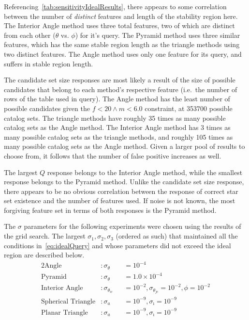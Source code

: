 Referencing~\autoref{tab:sensitivityIdealResults}, there appears to some correlation between the number of
\textit{distinct} features and length of the stability region here.
The Interior Angle method uses three total features, two of which are distinct from each other ($\theta$ vs. $\phi$) for
it's query.
The Pyramid method uses three similar features, which has the same stable region length as the triangle methods
using two distinct features.
The Angle method uses only one feature for its query, and suffers in stable region length.

The candidate set size responses are most likely a result of the size of possible candidates that belong to each
method's respective feature (i.e.\ the number of rows of the table used in query).
The Angle method has the least number of possible candidates given the $f < 20 \land m < 6.0$ constraint, at 353700
possible catalog sets.
The triangle methods have roughly 35 times as many possible catalog sets as the Angle method.
The Interior Angle method has 3 times as many possible catalog sets as the triangle methods, and roughly 105 times as many
possible catalog sets as the Angle method.
Given a larger pool of results to choose from, it follows that the number of false positive increases as well.

The largest $Q$ response belongs to the Interior Angle method, while the smallest response belongs to the Pyramid method.
Unlike the candidate set size response, there appears to be no obvious correlation between the response of correct
star set existence and the number of features used.
If noise is not known, the most forgiving feature set in terms of both responses is the Pyramid method.

The $\sigma$ parameters for the following experiments were chosen using the results of the grid search.
The largest $\sigma_1, \sigma_2, \sigma_3$ (ordered as such) that maintained all the conditions in~\autoref{eq:idealQuery} and whose
parameters did not exceed the ideal region are described below.
\begin{alignat*}{2}
    \text{Angle}&: \sigma_\theta &&= 10^{-4}\\
    \text{Pyramid}&: \sigma_\theta &&= 1.0 \times 10^{-4}\\
    \text{Interior Angle}&: \sigma_{\theta_{ic}} &&= 10^{-2}, \sigma_{\theta_{jc}} = 10^{-2}, \phi = 10^{-2} \\
    \text{Spherical Triangle}&: \sigma_a &&= 10^{-9}, \sigma_\imath = 10^{-9} \\
    \text{Planar Triangle}&: \sigma_a &&= 10^{-9}, \sigma_\imath = 10^{-9}
\end{alignat*}

